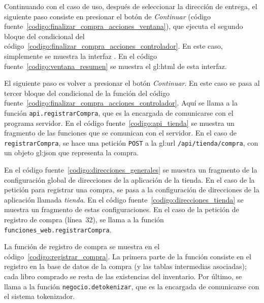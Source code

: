 Continuando con el caso de uso, después de seleccionar la dirección de entrega,
el siguiente paso consiste en presionar el botón de \textit{Continuar} (código
fuente~\ref{codigo:finalizar_compra_acciones_ventana}), que ejecuta el segundo
bloque del condicional del
código~\ref{codigo:finalizar_compra_acciones_controlador}. En este caso,
simplemente se muestra la interfaz . En
el código fuente~\ref{codigo:ventana_resumen} se muestra el \gls{gl:html} de
esta interfaz.


El siguiente paso es volver a presionar el botón \textit{Continuar}. En este
caso se pasa al tercer bloque del condicional de la función del código
fuente~\ref{codigo:finalizar_compra_acciones_controlador}. Aquí se llama a la
función \texttt{api.registrarCompra}, que es la encargada de comunicarse con el
programa servidor. En el código fuente~\ref{codigo:api_tienda} se muestra un
fragmento de las funciones que se comunican con el servidor. En el caso de
\texttt{registrarCompra}, se hace una petición \texttt{POST} a la \gls{gl:url}
\texttt{/api/tienda/compra}, con un objeto \gls{gl:json} que representa
la compra.


En el código fuente~\ref{codigo:direcciones_generales} se muestra un fragmento
de la configuración global de direcciones de la aplicación de la tienda. En el
caso de la petición para registrar una compra, se pasa a la configuración de
direcciones de la aplicación llamada \textit{tienda}. En el código
fuente~\ref{codigo:direcciones_tienda} se muestra un fragmento de estas
configuraciones. En el caso de la petición de registro de compra (línea~32), se
llama a la función \texttt{funciones\_web.registrarCompra}.



La función de registro de compra se muestra en el
código~\ref{codigo:registrar_compra}. La primera parte de la función consiste
en el registro en la base de datos de la compra (y las tablas intermedias
asociadas); cada libro comprado se resta de las existencias del inventario. Por
último, se llama a la función \texttt{negocio.detokenizar}, que es la encargada
de comunicarse con el sistema tokenizador.

